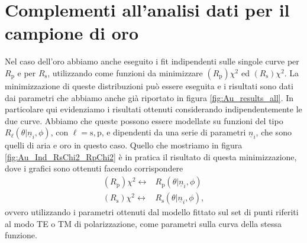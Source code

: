 \documentclass[
    prb,altaffilletter,citeautoscript,
    amsmath,amssymb,
    showpacs,showkeys,floatfix,
    reprint
]{revtex4-1}
\begin{document}
\section{Complementi all'analisi dati per il campione di oro}

Nel caso dell'oro abbiamo anche eseguito i fit indipendenti sulle singole curve per $R_\mathrm{p}$ e per $R_\mathrm{s}$, utilizzando come funzioni da minimizzare $(R_\mathrm{p})\chi^2$ ed $(R_\mathrm{s})\chi^2$. La minimizzazione di queste distribuzioni può essere eseguita e i risultati sono dati dai parametri che abbiamo anche già riportato in figura \ref{fig:Au_results_all}. In particolare qui evidenziamo i risultati ottenuti considerando indipendentemente le due curve. Abbiamo che queste possono essere modellate su funzioni del tipo $R_\ell(\theta|{\underline n_i}, \phi)$, con $\ell =\mathrm{s,p}$, e dipendenti da una serie di parametri $\underline n_i$, che sono quelli di aria e oro in questo caso. Quello che mostriamo in figura \ref{fig:Au_Ind_RsChi2_RpChi2} è in pratica il risultato di questa minimizzazione, dove i grafici sono ottenuti facendo corrispondere \begin{equation}
    \begin{aligned}
        (R_\mathrm{p})\chi^2 \longleftrightarrow& R_\mathrm{p}(\theta|{\underline n_i}, \phi)\\
        (R_\mathrm{s})\chi^2 \longleftrightarrow& R_\mathrm{s}(\theta|{\underline n_i}, \phi),
    \end{aligned}
\end{equation} ovvero utilizzando i parametri ottenuti dal modello fittato sul set di punti riferiti al modo TE o TM di polarizzazione, come parametri sulla curva della stessa funzione. 
\end{document}
